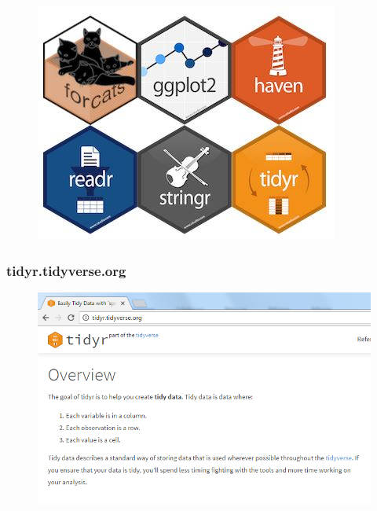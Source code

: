 \documentclass{beamer}
\begin{document}
\begin{frame}
	\begin{figure}
\centering
\includegraphics[width=0.9\linewidth]{images/tidyverse}

\end{figure}

\end{frame}
\begin{frame}
	\frametitle{tidyr.tidyverse.org}
	\begin{figure}
		\centering
		\includegraphics[width=1.05\linewidth]{images/tidyr-website}
		
	\end{figure}
	
\end{frame}
\end{document}
